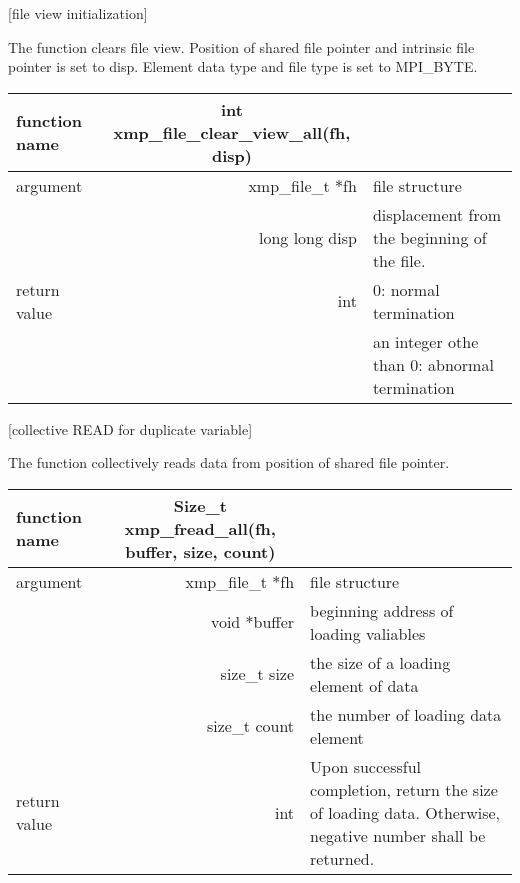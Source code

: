    
   [file view initialization]

   The function clears file view.
   Position of shared file pointer and intrinsic file pointer is set to
   disp.
   Element data type and file type is set to MPI\_BYTE.
   
   \begin{table}[h]
    \begin{center}
     \begin{tabular}{l|r|p{70mm}}
      \hline
      {\bf function name}  & \multicolumn{1}{c}{\bf int xmp\_file\_clear\_view\_all(fh,
      disp)} &  \\ \hline
      argument & xmp\_file\_t $*$fh & file structure \\ \cline{2-3}
      & long long disp & displacement from the beginning of the file. \\ \hline
      return value & int & 0: normal termination \\
      &  & an integer othe than 0: abnormal termination \\ \hline
      \end{tabular}
     \end{center}
    \label{tb:aaa}
   \end{table}


   [collective READ for duplicate variable]

   The function collectively reads data from position of shared file
   pointer.

   \begin{table}[h]
    \begin{center}
     \begin{tabular}{l|r|p{70mm}}
      \hline
      {\bf function name}  & \multicolumn{1}{c}{\bf Size\_t
      xmp\_fread\_all(fh, buffer, size, count)} &  \\ \hline
      argument & xmp\_file\_t $*$fh & file structure \\ \cline{2-3}
      & void $*$buffer & beginning address of loading valiables \\ \cline{2-3}
      & size\_t size & the size of a loading element of data \\ \cline{2-3}
      & size\_t count & the number of loading data element \\ \hline
      return value & int & Upon successful completion, return the size
	      of loading data. Otherwise, negative number shall be
	      returned. \\ \hline
      \end{tabular}
     \end{center}
    \label{tb:aaa}
   \end{table}


